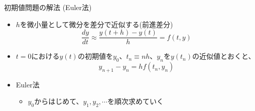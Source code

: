 \begin{frame}[t,fragile]{初期値問題の解法 (Euler法)}
  \begin{itemize}
  \item $h$を微小量として微分を差分で近似する(前進差分)
    \[
    \frac{dy}{dt} \approx \frac{y(t+h) - y(t)}{h} = f(t, y)
    \]
  \item $t=0$における$y(t)$の初期値を$y_0$、$t_n \equiv nh$、$y_n$を$y(t_n)$の近似値とおくと、
    \[
    y_{n+1}-y_n = h f( t_n, y_n)
    \]
  \item Euler法
    \begin{itemize}
    \item $y_0$からはじめて、$y_1,y_2,\cdots$を順次求めていく
    \end{itemize}
  \end{itemize}
\end{frame}
